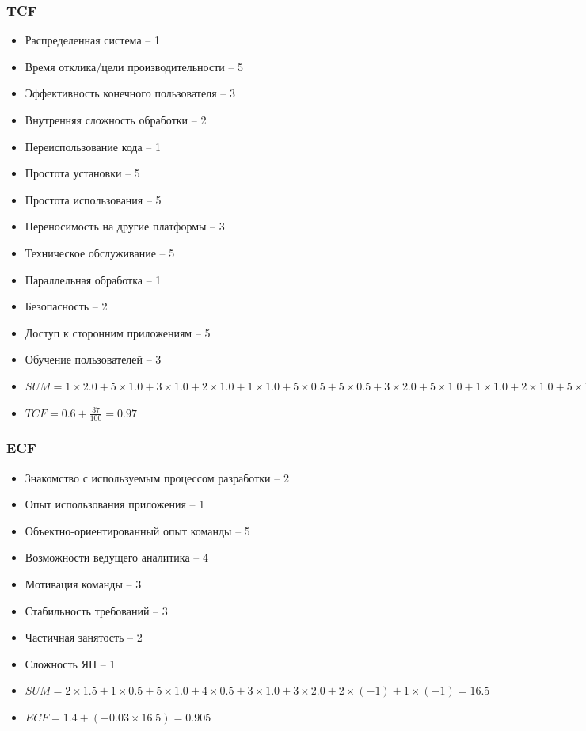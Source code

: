 \documentclass[a4paper,8pt]{article}
\begin{document}
\subsubsection{TCF}
\begin{itemize}
    \item Распределенная система -- 1
\item Время отклика/цели производительности  -- 5
\item Эффективность конечного пользователя -- 3
\item Внутренняя сложность обработки -- 2
\item Переиспользование кода -- 1 
\item Простота установки -- 5
\item Простота использования -- 5
\item Переносимость на другие платформы -- 3
\item Техническое обслуживание -- 5
\item Параллельная обработка  -- 1
\item Безопасность -- 2
\item Доступ к сторонним приложениям  -- 5
\item Обучение пользователей -- 3
\item $SUM = 1\times2.0 + 5\times1.0 + 3\times1.0 + 2\times1.0 + 1\times1.0 + 5\times0.5 + 5\times0.5 + 3\times2.0 + 5\times1.0 + 1\times1.0 + 2\times1.0 + 5\times1.0 + 3\times1.0 = 37$
\item $TCF =  0.6 + \frac{37}{100} = 0.97$
\end{itemize}

\subsubsection{ECF}
    \begin{itemize}
    \item Знакомство с используемым процессом разработки -- 2
    \item Опыт использования приложения -- 1
    \item Объектно-ориентированный опыт команды -- 5
    \item Возможности ведущего аналитика -- 4
    \item Мотивация команды -- 3
    \item Стабильность требований -- 3
    \item Частичная занятость -- 2
    \item Сложность ЯП -- 1
    \item $SUM = 2 \times 1.5 + 1\times0.5 + 5\times1.0 + 4\times0.5 + 3\times1.0 + 3\times2.0 + 2\times(-1) + 1\times(-1) = 16.5$
    \item $ECF = 1.4 + (-0.03 \times 16.5) = 0.905$
\end{itemize}
\end{document}
